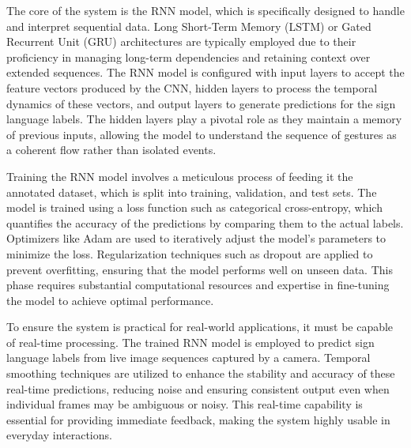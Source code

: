 The core of the system is the RNN model, which is specifically designed to handle and interpret sequential data. Long Short-Term Memory (LSTM) or Gated Recurrent Unit (GRU) architectures are typically employed due to their proficiency in managing long-term dependencies and retaining context over extended sequences. The RNN model is configured with input layers to accept the feature vectors produced by the CNN, hidden layers to process the temporal dynamics of these vectors, and output layers to generate predictions for the sign language labels. The hidden layers play a pivotal role as they maintain a memory of previous inputs, allowing the model to understand the sequence of gestures as a coherent flow rather than isolated events.

Training the RNN model involves a meticulous process of feeding it the annotated dataset, which is split into training, validation, and test sets. The model is trained using a loss function such as categorical cross-entropy, which quantifies the accuracy of the predictions by comparing them to the actual labels. Optimizers like Adam are used to iteratively adjust the model’s parameters to minimize the loss. Regularization techniques such as dropout are applied to prevent overfitting, ensuring that the model performs well on unseen data. This phase requires substantial computational resources and expertise in fine-tuning the model to achieve optimal performance.

To ensure the system is practical for real-world applications, it must be capable of real-time processing. The trained RNN model is employed to predict sign language labels from live image sequences captured by a camera. Temporal smoothing techniques are utilized to enhance the stability and accuracy of these real-time predictions, reducing noise and ensuring consistent output even when individual frames may be ambiguous or noisy. This real-time capability is essential for providing immediate feedback, making the system highly usable in everyday interactions.

